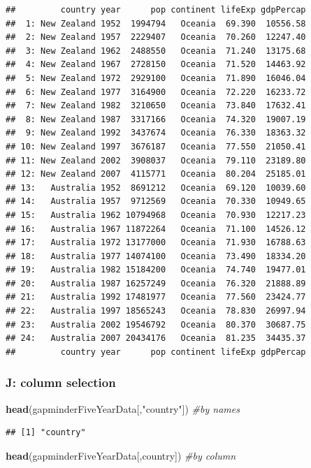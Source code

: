 \documentclass[]{article}
\newenvironment{Shaded}{\begin{snugshade}}{\end{snugshade}}
\newcommand{\KeywordTok}[1]{\textcolor[rgb]{0.13,0.29,0.53}{\textbf{{#1}}}}
\newcommand{\StringTok}[1]{\textcolor[rgb]{0.31,0.60,0.02}{{#1}}}
\newcommand{\CommentTok}[1]{\textcolor[rgb]{0.56,0.35,0.01}{\textit{{#1}}}}
\newcommand{\NormalTok}[1]{{#1}}
\begin{document}
\begin{verbatim}
##         country year      pop continent lifeExp gdpPercap
##  1: New Zealand 1952  1994794   Oceania  69.390  10556.58
##  2: New Zealand 1957  2229407   Oceania  70.260  12247.40
##  3: New Zealand 1962  2488550   Oceania  71.240  13175.68
##  4: New Zealand 1967  2728150   Oceania  71.520  14463.92
##  5: New Zealand 1972  2929100   Oceania  71.890  16046.04
##  6: New Zealand 1977  3164900   Oceania  72.220  16233.72
##  7: New Zealand 1982  3210650   Oceania  73.840  17632.41
##  8: New Zealand 1987  3317166   Oceania  74.320  19007.19
##  9: New Zealand 1992  3437674   Oceania  76.330  18363.32
## 10: New Zealand 1997  3676187   Oceania  77.550  21050.41
## 11: New Zealand 2002  3908037   Oceania  79.110  23189.80
## 12: New Zealand 2007  4115771   Oceania  80.204  25185.01
## 13:   Australia 1952  8691212   Oceania  69.120  10039.60
## 14:   Australia 1957  9712569   Oceania  70.330  10949.65
## 15:   Australia 1962 10794968   Oceania  70.930  12217.23
## 16:   Australia 1967 11872264   Oceania  71.100  14526.12
## 17:   Australia 1972 13177000   Oceania  71.930  16788.63
## 18:   Australia 1977 14074100   Oceania  73.490  18334.20
## 19:   Australia 1982 15184200   Oceania  74.740  19477.01
## 20:   Australia 1987 16257249   Oceania  76.320  21888.89
## 21:   Australia 1992 17481977   Oceania  77.560  23424.77
## 22:   Australia 1997 18565243   Oceania  78.830  26997.94
## 23:   Australia 2002 19546792   Oceania  80.370  30687.75
## 24:   Australia 2007 20434176   Oceania  81.235  34435.37
##         country year      pop continent lifeExp gdpPercap
\end{verbatim}

\subsubsection{J: column selection}\label{j-column-selection}

\begin{Shaded}
\begin{Highlighting}[]
\KeywordTok{head}\NormalTok{(gapminderFiveYearData[,}\StringTok{"country"}\NormalTok{]) }\CommentTok{#by names}
\end{Highlighting}
\end{Shaded}

\begin{verbatim}
## [1] "country"
\end{verbatim}

\begin{Shaded}
\begin{Highlighting}[]
\KeywordTok{head}\NormalTok{(gapminderFiveYearData[,country]) }\CommentTok{#by column}
\end{Highlighting}
\end{Shaded}
\end{document}

